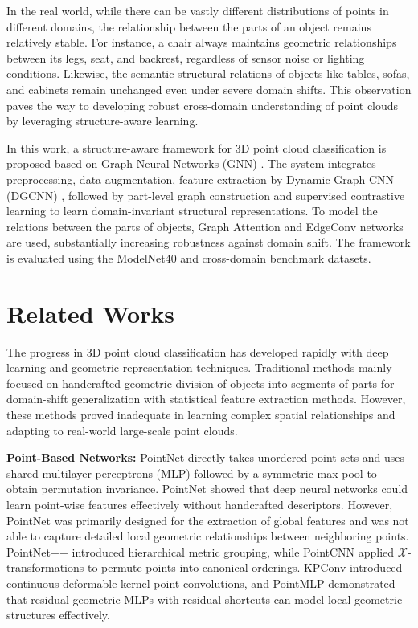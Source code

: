 \documentclass[conference]{IEEEtran}
\begin{document}
In the real world, while there can be vastly different distributions of points in different domains, the relationship between the parts of an object remains relatively stable. For instance, a chair always maintains geometric relationships between its legs, seat, and backrest, regardless of sensor noise or lighting conditions. Likewise, the semantic structural relations of objects like tables, sofas, and cabinets remain unchanged even under severe domain shifts. This observation paves the way to developing robust cross-domain understanding of point clouds by leveraging structure-aware learning.

In this work, a structure-aware framework for 3D point cloud classification is proposed based on Graph Neural Networks (GNN) \cite{bronstein2017geometric}. The system integrates preprocessing, data augmentation, feature extraction by Dynamic Graph CNN (DGCNN) \cite{wang2019dynamic}, followed by part-level graph construction and supervised contrastive learning to learn domain-invariant structural representations. To model the relations between the parts of objects, Graph Attention and EdgeConv networks are used, substantially increasing robustness against domain shift. The framework is evaluated using the ModelNet40 and cross-domain benchmark datasets.

\section{Related Works}
The progress in 3D point cloud classification has developed rapidly with deep learning and geometric representation techniques. Traditional methods mainly focused on handcrafted geometric division of objects into segments of parts for domain-shift generalization with statistical feature extraction methods. However, these methods proved inadequate in learning complex spatial relationships and adapting to real-world large-scale point clouds.

\textbf{Point-Based Networks:} PointNet \cite{qi2017pointnet} directly takes unordered point sets and uses shared multilayer perceptrons (MLP) followed by a symmetric max-pool to obtain permutation invariance. PointNet showed that deep neural networks could learn point-wise features effectively without handcrafted descriptors. However, PointNet was primarily designed for the extraction of global features and was not able to capture detailed local geometric relationships between neighboring points. PointNet++ \cite{qi2017pointnetplusplus} introduced hierarchical metric grouping, while PointCNN \cite{li2018pointcnn} applied $\mathcal{X}$-transformations to permute points into canonical orderings. KPConv \cite{thomas2019kpconv} introduced continuous deformable kernel point convolutions, and PointMLP \cite{ma2022pointmlp} demonstrated that residual geometric MLPs with residual shortcuts \cite{he2016deep} can model local geometric structures effectively.
\end{document}
